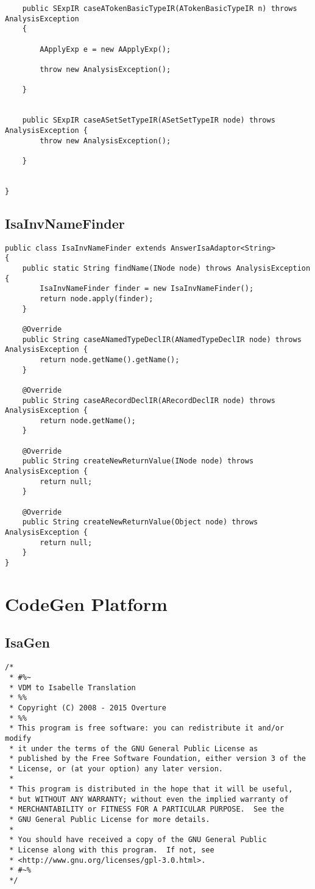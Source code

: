 \begin{appendices}
\begin{lstlisting}
    public SExpIR caseATokenBasicTypeIR(ATokenBasicTypeIR n) throws AnalysisException
    {

        AApplyExp e = new AApplyExp();

        throw new AnalysisException();

    }


    public SExpIR caseASetSetTypeIR(ASetSetTypeIR node) throws AnalysisException {
        throw new AnalysisException();

    }


}
\end{lstlisting}

\subsection{IsaInvNameFinder} \label{IsaInvNameFinderbefore}
\begin{lstlisting}
public class IsaInvNameFinder extends AnswerIsaAdaptor<String>
{
    public static String findName(INode node) throws AnalysisException {
        IsaInvNameFinder finder = new IsaInvNameFinder();
        return node.apply(finder);
    }

    @Override
    public String caseANamedTypeDeclIR(ANamedTypeDeclIR node) throws AnalysisException {
        return node.getName().getName();
    }

    @Override
    public String caseARecordDeclIR(ARecordDeclIR node) throws AnalysisException {
        return node.getName();
    }

    @Override
    public String createNewReturnValue(INode node) throws AnalysisException {
        return null;
    }

    @Override
    public String createNewReturnValue(Object node) throws AnalysisException {
        return null;
    }
}
\end{lstlisting}

\section{CodeGen Platform}
\subsection{IsaGen} \label{IsaGenbefore}
\begin{lstlisting}
/*
 * #%~
 * VDM to Isabelle Translation
 * %%
 * Copyright (C) 2008 - 2015 Overture
 * %%
 * This program is free software: you can redistribute it and/or modify
 * it under the terms of the GNU General Public License as
 * published by the Free Software Foundation, either version 3 of the
 * License, or (at your option) any later version.
 * 
 * This program is distributed in the hope that it will be useful,
 * but WITHOUT ANY WARRANTY; without even the implied warranty of
 * MERCHANTABILITY or FITNESS FOR A PARTICULAR PURPOSE.  See the
 * GNU General Public License for more details.
 * 
 * You should have received a copy of the GNU General Public
 * License along with this program.  If not, see
 * <http://www.gnu.org/licenses/gpl-3.0.html>.
 * #~%
 */


\end{lstlisting}
\end{appendices}
